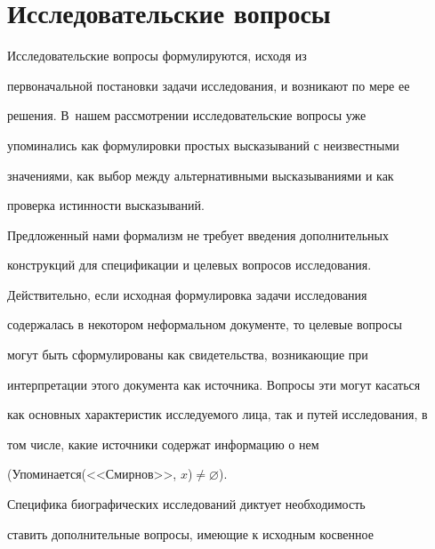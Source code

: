 




\section{Исследовательские вопросы}







     


     Исследовательские вопросы  формулируются, исходя из 


первоначальной постановки задачи исследования, и возникают по мере ее 


решения. В~нашем рассмотрении исследовательские вопросы уже 


упоминались как формулировки простых высказываний с неизвестными 


значениями, как выбор между альтернативными высказываниями и как  


проверка истинности высказываний. 


     


     Предложенный нами формализм не требует введения дополнительных 


конструкций для спецификации и целевых вопросов исследования. 


Действительно, если исходная формулировка задачи исследования 


содержалась в некотором неформальном документе, то целевые вопросы 


могут быть сформулированы как свидетельства, возникающие при 


интерпретации этого документа как источника. Вопросы эти могут касаться 


как основных характеристик исследуемого лица, так и путей исследования,  в 


том числе, какие источники содержат информацию о нем 


(Упоминается(<<Смирнов>>, $x$)\;$\not=$\;$\varnothing$).


     


     Специфика биографических исследований диктует необходимость 


ставить дополнительные вопросы, имеющие к исходным косвенное 


